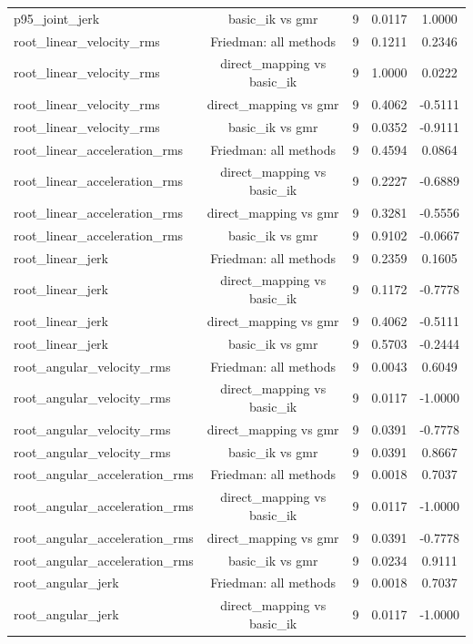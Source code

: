 \begin{table}[t]
{\begin{tabular}{lcccc}
p95\_joint\_jerk & basic\_ik vs gmr & 9 & 0.0117 & 1.0000 \\
root\_linear\_velocity\_rms & Friedman: all methods & 9 & 0.1211 & 0.2346 \\
root\_linear\_velocity\_rms & direct\_mapping vs basic\_ik & 9 & 1.0000 & 0.0222 \\
root\_linear\_velocity\_rms & direct\_mapping vs gmr & 9 & 0.4062 & -0.5111 \\
root\_linear\_velocity\_rms & basic\_ik vs gmr & 9 & 0.0352 & -0.9111 \\
root\_linear\_acceleration\_rms & Friedman: all methods & 9 & 0.4594 & 0.0864 \\
root\_linear\_acceleration\_rms & direct\_mapping vs basic\_ik & 9 & 0.2227 & -0.6889 \\
root\_linear\_acceleration\_rms & direct\_mapping vs gmr & 9 & 0.3281 & -0.5556 \\
root\_linear\_acceleration\_rms & basic\_ik vs gmr & 9 & 0.9102 & -0.0667 \\
root\_linear\_jerk & Friedman: all methods & 9 & 0.2359 & 0.1605 \\
root\_linear\_jerk & direct\_mapping vs basic\_ik & 9 & 0.1172 & -0.7778 \\
root\_linear\_jerk & direct\_mapping vs gmr & 9 & 0.4062 & -0.5111 \\
root\_linear\_jerk & basic\_ik vs gmr & 9 & 0.5703 & -0.2444 \\
root\_angular\_velocity\_rms & Friedman: all methods & 9 & 0.0043 & 0.6049 \\
root\_angular\_velocity\_rms & direct\_mapping vs basic\_ik & 9 & 0.0117 & -1.0000 \\
root\_angular\_velocity\_rms & direct\_mapping vs gmr & 9 & 0.0391 & -0.7778 \\
root\_angular\_velocity\_rms & basic\_ik vs gmr & 9 & 0.0391 & 0.8667 \\
root\_angular\_acceleration\_rms & Friedman: all methods & 9 & 0.0018 & 0.7037 \\
root\_angular\_acceleration\_rms & direct\_mapping vs basic\_ik & 9 & 0.0117 & -1.0000 \\
root\_angular\_acceleration\_rms & direct\_mapping vs gmr & 9 & 0.0391 & -0.7778 \\
root\_angular\_acceleration\_rms & basic\_ik vs gmr & 9 & 0.0234 & 0.9111 \\
root\_angular\_jerk & Friedman: all methods & 9 & 0.0018 & 0.7037 \\
root\_angular\_jerk & direct\_mapping vs basic\_ik & 9 & 0.0117 & -1.0000 \\

\end{tabular}}
\end{table}
